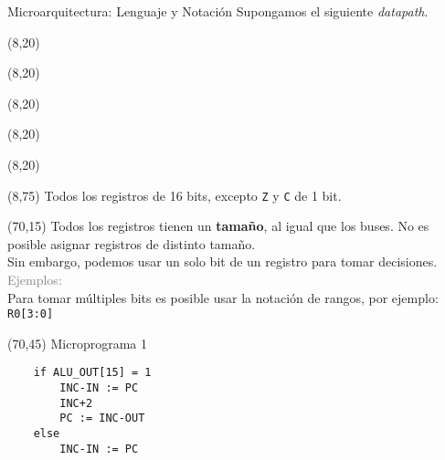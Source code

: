 \documentclass[aspectratio=169]{beamer}
\begin{document}
\begin{frame}[fragile,t]{Microarquitectura: Lenguaje y Notación}
    Supongamos el siguiente \emph{datapath}.
    \begin{textblock}{70}(8,20)  \end{textblock}
    \begin{textblock}{70}(8,20)  \end{textblock}
    \begin{textblock}{70}(8,20)  \end{textblock}
    \begin{textblock}{70}(8,20)  \end{textblock}
    \begin{textblock}{70}(8,20)  \end{textblock}
    \begin{textblock}{70}(8,75) \scriptsize Todos los registros de 16 bits, excepto \texttt{Z} y \texttt{C} de 1 bit. \end{textblock}
    \begin{textblock}{76}(70,15)
    \small
    Todos los registros tienen un \textbf{tamaño}, al igual que los buses. No es posible asignar registros de distinto tamaño.\\
    \vspace{0.2cm}
    Sin embargo, podemos usar un solo bit de un registro para tomar decisiones.\\
    \vspace{0.2cm}
    \textcolor{gray}{Ejemplos:}\\
    \vspace{3.5cm}
    Para tomar múltiples bits es posible usar la notación de rangos, por ejemplo: \texttt{R0[3:0]}
    \end{textblock}
    \begin{textblock}{76}(70,45)
    \scriptsize
    \textcolor{verdeuca}{Microprograma 1}\\
    \vspace{-0.3cm}
    \begin{verbatim}
    if ALU_OUT[15] = 1
        INC-IN := PC
        INC+2
        PC := INC-OUT
    else
        INC-IN := PC

\end{verbatim}
\end{textblock}
\end{frame}
\end{document}
